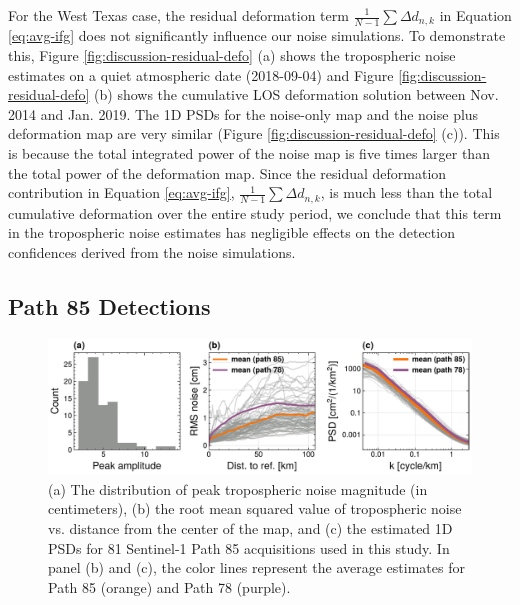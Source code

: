 For the West Texas case, the residual deformation term $  \frac{1}{N-1}  \sum  \Delta d_{n,k} $ in Equation \eqref{eq:avg-ifg} does not significantly influence our noise simulations. To demonstrate this, Figure \ref{fig:discussion-residual-defo} (a) shows the tropospheric noise estimates on a quiet atmospheric date (2018-09-04) and Figure  \ref{fig:discussion-residual-defo} (b) shows the cumulative LOS deformation solution between  Nov. 2014 and Jan. 2019. The 1D PSDs for the noise-only map and the noise plus deformation map are very similar (Figure \ref{fig:discussion-residual-defo} (c)). This is because the total integrated power of the noise map is five times larger than the total power of the deformation map. Since the residual deformation contribution in Equation \eqref{eq:avg-ifg}, $ \frac{1}{N-1}  \sum  \Delta d_{n,k} $, is much less than the total cumulative deformation over the entire study period, we conclude that this term in the tropospheric noise estimates has negligible effects on the detection confidences derived from the noise simulations.

\FloatBarrier

\subsection{Path 85 Detections}
\label{subsec:discussion-path85}



\begin{figure}[h]
	\centering 
	\includegraphics[width=0.98\linewidth]{figures/chapter6-blobs/figure_discussion_path85_plots.pdf}
	\caption[Path 85 estimated tropospheric turbulence noise maps]{
		(a) The distribution of peak tropospheric noise magnitude (in centimeters), (b) the root mean squared value of tropospheric noise vs. distance from the center of the map, and (c) the estimated 1D PSDs for 81 Sentinel-1 Path 85 acquisitions used in this study. In panel (b) and (c), the color lines represent the average estimates for Path 85 (orange) and Path 78 (purple).
	}
	\label{fig:discussion-noise-85}
\end{figure}


